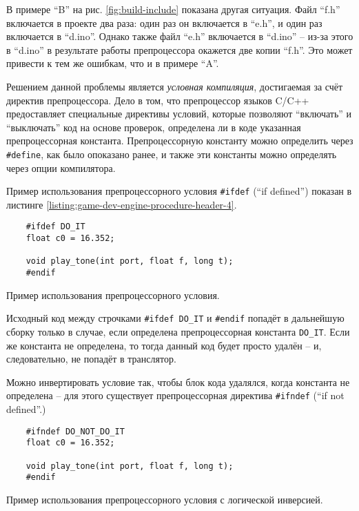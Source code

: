\documentclass[../sparc.tex]{subfiles}
\begin{document}
В примере ``B'' на рис. \ref{fig:build-include} показана другая ситуация.  Файл
``f.h'' включается в проекте два раза: один раз он включается в ``e.h'', и один
раз включается в ``d.ino''.  Однако также файл ``e.h'' включается в ``d.ino'' --
из-за этого в ``d.ino'' в результате работы препроцессора окажется две копии
``f.h''.  Это может привести к тем же ошибкам, что и в примере ``A''.

Решением данной проблемы является \emph{условная компиляция}, достигаемая за
счёт директив препроцессора.  Дело в том, что препроцессор языков C/C++
предоставляет специальные директивы условий, которые позволяют ``включать'' и
``выключать'' код на основе проверок, определена ли в коде указанная
препроцессорная константа.  Препроцессорную константу можно определить через
\texttt{#define}, как было опоказано ранее, и также эти константы можно
определять через опции компилятора.

Пример использования препроцессорного условия \texttt{#ifdef} (``if
defined'') показан в листинге \ref{listing:game-dev-engine-procedure-header-4}.

\begin{listing}[H]
  \begin{verbatim}
    #ifdef DO_IT
    float c0 = 16.352;

    void play_tone(int port, float f, long t);
    #endif
  \end{verbatim}
  \label{listing:game-dev-engine-procedure-header-4}
  \caption{Пример использования препроцессорного условия.}
\end{listing}

Исходный код между строчками \texttt{#ifdef DO_IT} и
\texttt{#endif} попадёт в дальнейшую сборку только в случае, если
определена препроцессорная константа \texttt{DO_IT}.  Если же константа
не определена, то тогда данный код будет просто удалён -- и, следовательно, не
попадёт в транслятор.

Можно инвертировать условие так, чтобы блок кода удалялся, когда константа не
определена -- для этого существует препроцессорная директива
\texttt{#ifndef} (``if not defined''.)

\begin{listing}[H]
  \begin{verbatim}
    #ifndef DO_NOT_DO_IT
    float c0 = 16.352;

    void play_tone(int port, float f, long t);
    #endif
  \end{verbatim}
  \label{listing:game-dev-engine-procedure-header-5}
  \caption{Пример использования препроцессорного условия с логической
    инверсией.}
\end{listing}
\end{document}
